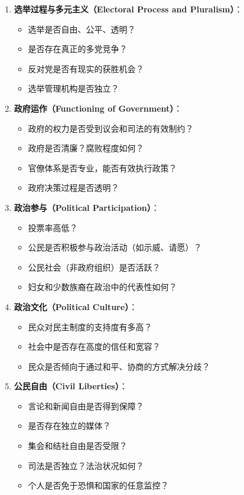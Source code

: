 \begin{enumerate}
    \item \textbf{选举过程与多元主义（Electoral Process and Pluralism）}：
    \begin{itemize}
        \item 选举是否自由、公平、透明？
        \item 是否存在真正的多党竞争？
        \item 反对党是否有现实的获胜机会？
        \item 选举管理机构是否独立？
    \end{itemize}

    \item \textbf{政府运作（Functioning of Government）}：
    \begin{itemize}
        \item 政府的权力是否受到议会和司法的有效制约？
        \item 政府是否清廉？腐败程度如何？
        \item 官僚体系是否专业，能否有效执行政策？
        \item 政府决策过程是否透明？
    \end{itemize}

    \item \textbf{政治参与（Political Participation）}：
    \begin{itemize}
        \item 投票率高低？
        \item 公民是否积极参与政治活动（如示威、请愿）？
        \item 公民社会（非政府组织）是否活跃？
        \item 妇女和少数族裔在政治中的代表性如何？
    \end{itemize}

    \item \textbf{政治文化（Political Culture）}：
    \begin{itemize}
        \item 民众对民主制度的支持度有多高？
        \item 社会中是否存在高度的信任和宽容？
        \item 民众是否倾向于通过和平、协商的方式解决分歧？
    \end{itemize}

    \item \textbf{公民自由（Civil Liberties）}：
    \begin{itemize}
        \item 言论和新闻自由是否得到保障？
        \item 是否存在独立的媒体？
        \item 集会和结社自由是否受限？
        \item 司法是否独立？法治状况如何？
        \item 个人是否免于恐惧和国家的任意监控？
    \end{itemize}
\end{enumerate}

